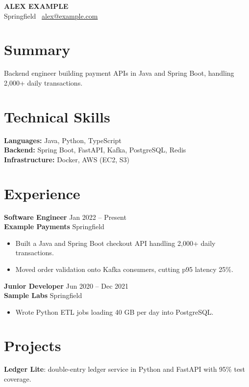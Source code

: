 \documentclass[10pt,letterpaper]{article}
\begin{document}
\begin{center}
  {\LARGE \textbf{ALEX EXAMPLE}}\\[2pt]
  Springfield \textbar\ \href{mailto:alex@example.com}{alex@example.com}
\end{center}

\section*{Summary}
Backend engineer building payment APIs in Java and Spring Boot, handling 2,000+ daily transactions.

\section*{Technical Skills}
\textbf{Languages:} Java, Python, TypeScript\\
\textbf{Backend:} Spring Boot, FastAPI, Kafka, PostgreSQL, Redis\\
\textbf{Infrastructure:} Docker, AWS (EC2, S3)

\section*{Experience}
\textbf{Software Engineer} \hfill Jan 2022 -- Present\\
\textbf{Example Payments} \hfill Springfield
\begin{itemize}
  \item Built a Java and Spring Boot checkout API handling 2,000+ daily transactions.
  \item Moved order validation onto Kafka consumers, cutting p95 latency 25\%.
\end{itemize}

\textbf{Junior Developer} \hfill Jun 2020 -- Dec 2021\\
\textbf{Sample Labs} \hfill Springfield
\begin{itemize}
  \item Wrote Python ETL jobs loading 40 GB per day into PostgreSQL.
\end{itemize}

\section*{Projects}
\textbf{Ledger Lite}: double-entry ledger service in Python and FastAPI with 95\% test coverage.
\end{document}
